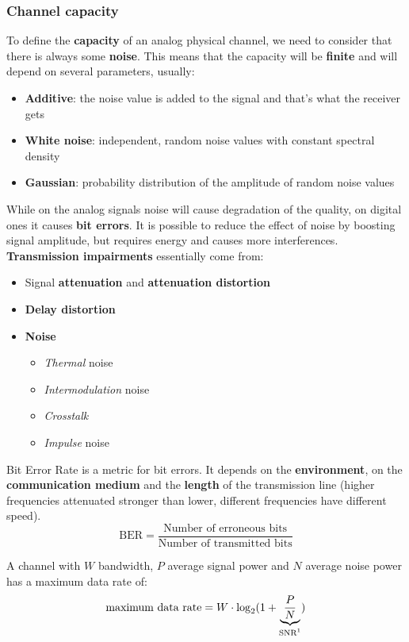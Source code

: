 \subsubsection{Channel capacity}
To define the \textbf{capacity} of an analog physical channel, we need to consider that there is always some \textbf{noise}. This means that the capacity will be \textbf{finite} and will depend on several parameters, usually:
\begin{itemize}
	\item \textbf{Additive}: the noise value is added to the signal and that's what the receiver gets
	\item \textbf{White noise}: independent, random noise values with constant spectral density
	\item \textbf{Gaussian}: probability distribution of the amplitude of random noise values
\end{itemize}
While on the analog signals noise will cause degradation of the quality, on digital ones it causes \textbf{bit errors}. It is possible to reduce the effect of noise by boosting signal amplitude, but requires energy and causes more interferences.\\ \textbf{Transmission impairments} essentially come from:
\begin{itemize}
	\item Signal \textbf{attenuation} and \textbf{attenuation distortion}
	\item \textbf{Delay distortion}
	\item \textbf{Noise}
	\begin{itemize}
		\item \textit{Thermal} noise
		\item \textit{Intermodulation} noise
		\item \textit{Crosstalk}
		\item \textit{Impulse} noise
	\end{itemize}
\end{itemize}
\newpage
\begin{definition}[BER]
	Bit Error Rate is a metric for bit errors. It depends on the \textbf{environment}, on the \textbf{communication medium} and the \textbf{length} of the transmission line (higher frequencies attenuated stronger than lower, different frequencies have different speed).
	\begin{equation}
		\text{BER} = \frac{\text{Number of erroneous bits}}{\text{Number of transmitted bits}}
	\end{equation}
\end{definition}
\begin{theorem}
	A channel with $W$ bandwidth, $P$ average signal power and $N$ average noise power has a maximum data rate of:
	\begin{equation}
		\text{maximum data rate} = W \cdot \log_2(1+\underbrace{\frac{P}{N}}_{\text{SNR\footnotemark}})
	\end{equation}
\end{theorem}


